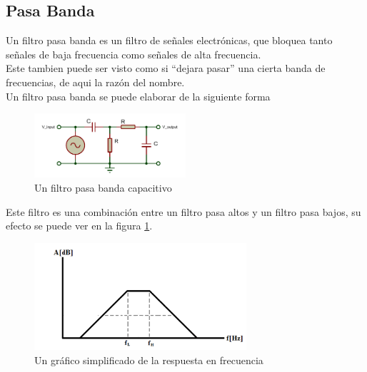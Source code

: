 \documentclass[../main.tex]{subfiles}
\begin{document}
	\subsection{Pasa Banda}
	Un filtro pasa banda es un filtro de señales electrónicas, que bloquea tanto señales 
	de baja frecuencia como señales de alta frecuencia. \\
	Este tambien puede ser visto como si ``dejara pasar'' una cierta banda de frecuencias,
	de aqui la razón del nombre. \\
	Un filtro pasa banda se puede elaborar de la siguiente forma
	\begin{figure}[H]
		\centering
		\includegraphics[width=0.5\textwidth]{filtros/pasa-banda_cap1.pdf}
		\caption{Un filtro pasa banda capacitivo}
	\end{figure}

	Este filtro es una combinación entre un filtro pasa altos y un filtro pasa bajos,
	su efecto se puede ver en la figura \ref{pasa-banda_grafico}.
	\begin{figure}[H]
		\centering
		\includegraphics[width=0.7\textwidth]{filtros/pasa-banda_grafico.png}
		\caption{Un gráfico simplificado de la respuesta en frecuencia}
		\label{pasa-banda_grafico}
	\end{figure}
\end{document}
